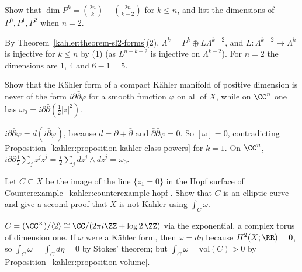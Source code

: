 \begin{exercise}\label{kahler:exercise-primitive-dimension}
Show that $\dim P^k = \binom{2n}{k} - \binom{2n}{k-2}$ for $k \leq n$, and list the dimensions of $P^0, P^1, P^2$ when $n = 2$.
\end{exercise}

\begin{solution}
By Theorem~\ref{kahler:theorem-sl2-forms}(2), $\Lambda^k = P^k \oplus L\Lambda^{k-2}$, and $L \colon \Lambda^{k-2} \to \Lambda^k$ is injective
for $k \leq n$ by (1) (as $L^{n-k+2}$ is injective on $\Lambda^{k-2}$). For $n = 2$ the dimensions are $1$, $4$ and $6 - 1 = 5$.
\end{solution}

\begin{exercise}\label{kahler:exercise-no-global-potential}
Show that the K\"ahler form of a compact K\"ahler manifold of positive dimension is never of the form $i\partial\bar\partial\varphi$ for a
smooth function $\varphi$ on all of $X$, while on $\CC^n$ one has $\omega_0 = i\partial\bar\partial(\frac12|z|^2)$.
\end{exercise}

\begin{solution}
$i\partial\bar\partial\varphi = d(i\bar\partial\varphi)$, because $d = \partial + \bar\partial$ and $\bar\partial\bar\partial\varphi = 0$. So
$[\omega] = 0$, contradicting Proposition~\ref{kahler:proposition-kahler-class-powers} for $k = 1$. On $\CC^n$,
$i\partial\bar\partial\frac12\sum_jz^j\bar z^j = \frac{i}{2}\sum_jdz^j \wedge d\bar z^j = \omega_0$.
\end{solution}

\begin{exercise}\label{kahler:exercise-hopf-direct}
Let $C \subseteq X$ be the image of the line $\{z_1 = 0\}$ in the Hopf surface of Counterexample~\ref{kahler:counterexample-hopf}. Show that $C$ is
an elliptic curve and give a second proof that $X$ is not K\"ahler using $\int_C\omega$.
\end{exercise}

\begin{solution}
$C = (\CC^\times)/\langle 2\rangle \cong \CC/(2\pi i\ZZ + \log 2\,\ZZ)$ via the exponential, a complex torus of dimension one. If $\omega$ were a
K\"ahler form, then $\omega = d\eta$ because $H^2(X; \RR) = 0$, so $\int_C\omega = \int_Cd\eta = 0$ by Stokes' theorem; but
$\int_C\omega = \mathrm{vol}(C) > 0$ by Proposition~\ref{kahler:proposition-volume}.
\end{solution}

